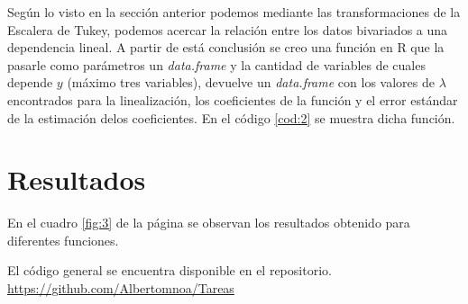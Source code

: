 \documentclass{article}
\begin{document}
Según lo visto en la sección anterior podemos mediante las transformaciones de la Escalera de Tukey, podemos acercar la relación entre los datos bivariados a una dependencia lineal. A partir de está conclusión se creo una función en R que la pasarle como parámetros un \textit{data.frame} y la cantidad de variables de cuales depende $y$ (máximo tres variables), devuelve un \textit{data.frame} con los valores de $\lambda$ encontrados para la linealización, los coeficientes de la función y el error estándar de la estimación delos coeficientes. En el código \ref{cod:2} se muestra dicha función. 
\begin{center}

\label{cod:2}
\end{center}
\section{Resultados}
En el cuadro \ref{fig:3} de la página \pageref{fig:3} se observan los resultados obtenido para diferentes funciones.



El código general se encuentra disponible en el repositorio. \href{https://github.com/Albertomnoa/Tareas_MPA/tree/master/Tarea4}{https://github.com/Albertomnoa/Tareas} 

\newpage


\end{document}
